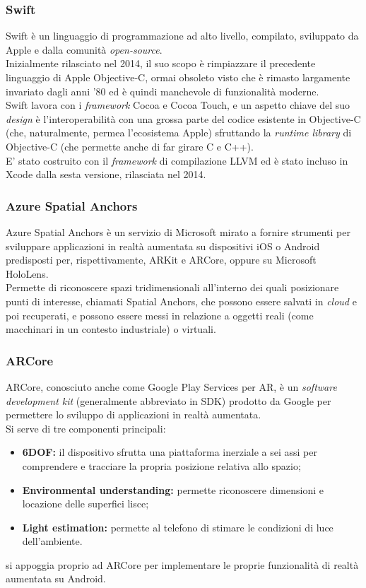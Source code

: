 \subsubsection{Swift}
Swift è un linguaggio di programmazione ad alto livello, compilato, sviluppato da Apple e dalla comunità \textit{open-source}.\\
Inizialmente rilasciato nel 2014, il suo scopo è rimpiazzare il precedente linguaggio di Apple Objective-C, ormai obsoleto visto che è rimasto largamente invariato dagli anni '80 ed è quindi manchevole di funzionalità moderne.\\
Swift lavora con i \textit{framework} Cocoa e Cocoa Touch, e un aspetto chiave del suo \textit{design} è l'interoperabilità con una grossa parte del codice esistente in Objective-C (che, naturalmente, permea l'ecosistema Apple) sfruttando la \textit{runtime library} di Objective-C (che permette anche di far girare C e C++).\\
E' stato costruito con il \textit{framework} di compilazione LLVM ed è stato incluso in Xcode dalla sesta versione, rilasciata nel 2014.

\subsubsection{Azure Spatial Anchors}
Azure Spatial Anchors è un servizio di Microsoft mirato a fornire strumenti per sviluppare applicazioni in realtà aumentata su dispositivi iOS o Android predisposti per, rispettivamente, ARKit e ARCore, oppure su Microsoft HoloLens.\\
Permette di riconoscere spazi tridimensionali all'interno dei quali posizionare punti di interesse, chiamati Spatial Anchors, che possono essere salvati in \textit{cloud} e poi recuperati, e possono essere messi in relazione a oggetti reali (come macchinari in un contesto industriale) o virtuali.

\subsubsection{ARCore}
ARCore, conosciuto anche come Google Play Services per AR, è un \textit{software development kit} (generalmente abbreviato in SDK) prodotto da Google per permettere lo sviluppo di applicazioni in realtà aumentata.\\
Si serve di tre componenti principali:
\begin{itemize}
    \item \textbf{6DOF:} il dispositivo sfrutta una piattaforma inerziale a sei assi per comprendere e tracciare la propria posizione relativa allo spazio;
    \item \textbf{Environmental understanding:} permette riconoscere dimensioni e locazione delle superfici lisce;
    \item \textbf{Light estimation:} permette al telefono di stimare le condizioni di luce dell'ambiente.
\end{itemize}
\asa{} si appoggia proprio ad ARCore per implementare le proprie funzionalità di realtà aumentata su Android.

